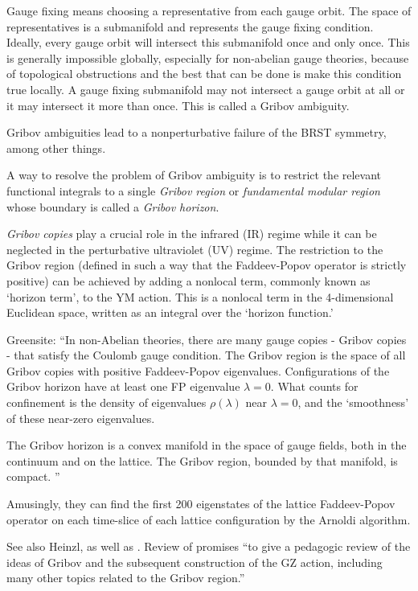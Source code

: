 \begin{description}
Gauge fixing means choosing a representative from each gauge orbit. The
space of representatives is a submanifold and represents the gauge fixing
condition. Ideally, every gauge orbit will intersect this submanifold
once and only once. This is generally impossible globally, especially for
non-abelian gauge theories, because of topological obstructions and the
best that can be done is make this condition true locally. A gauge fixing
submanifold may not intersect a gauge orbit at all or it may intersect it
more than once. This is called a Gribov ambiguity.

Gribov ambiguities lead to a nonperturbative failure of the BRST
symmetry, among other things.

A way to resolve the problem of Gribov ambiguity is to restrict the
relevant functional integrals to a single \emph{Gribov region} or {\em
fundamental modular region} whose boundary is called a \emph{Gribov
horizon}.

{\em Gribov copies} play a crucial role in the infrared (IR) regime while
it can be neglected in the perturbative ultraviolet (UV)
regime. The restriction to the Gribov region
(defined in such a way that the Faddeev-Popov operator is strictly
positive) can be achieved by adding a nonlocal term, commonly known as
`horizon term', to the YM action. This is a
nonlocal term in the 4-dimensional Euclidean space, written as an
integral over the `horizon function.'

Greensite: ``In non-Abelian theories, there are many gauge copies -
Gribov copies - that satisfy the Coulomb gauge condition. The Gribov
region is the space of all Gribov copies with positive Faddeev-Popov
eigenvalues. Configurations of the Gribov horizon have at least one FP
eigenvalue $\lambda =0$. What counts for confinement is the density of
eigenvalues $\rho(\lambda)$ near $\lambda =0$, and the `smoothness' of
these near-zero eigenvalues.

The Gribov horizon is a convex manifold in the space of gauge fields,
both in the continuum and on the lattice. The Gribov region, bounded by
that manifold, is compact.
''

Amusingly, they can find the first 200 eigenstates of the lattice
Faddeev-Popov operator on each time-slice of each lattice configuration
by the Arnoldi algorithm.

See also Heinzl, as well as
.
Review of  promises ``to give a pedagogic review of the
ideas of Gribov and the subsequent construction of the GZ action,
including many other topics related to the Gribov region.''



\end{description}
